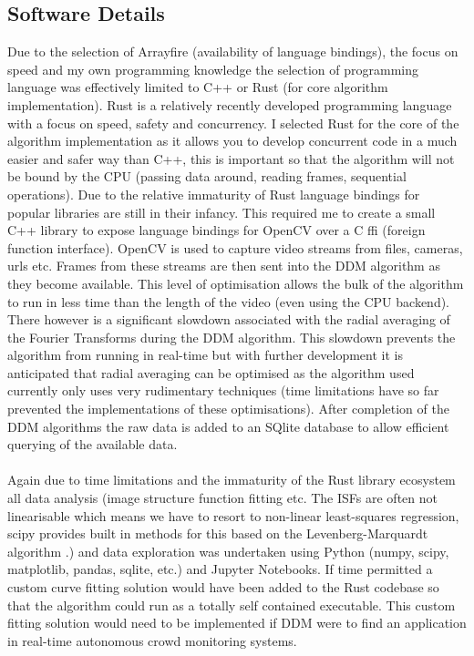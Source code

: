 \documentclass[11pt]{article}
\begin{document}
\subsection{Software Details}
Due to the selection of Arrayfire (availability of language bindings), the focus on speed and my own programming knowledge the selection of programming language was effectively limited to C++ or Rust \cite{rust} (for core algorithm implementation). Rust is a relatively recently developed programming language with a focus on speed, safety and concurrency. I selected Rust for the core of the algorithm implementation as it allows you to develop concurrent code in a much easier and safer way than C++, this is important so that the algorithm will not be bound by the CPU (passing data around, reading frames, sequential operations). Due to the relative immaturity of Rust language bindings for popular libraries are still in their infancy. This required me to create a small C++ library to expose language bindings for OpenCV over a C ffi (foreign function interface). OpenCV is used to capture video streams from files, cameras, urls etc. Frames from these streams are then sent into the DDM algorithm as they become available. This level of optimisation allows the bulk of the algorithm to run in less time than the length of the video (even using the CPU backend). There however is a significant slowdown associated with the radial averaging of the Fourier Transforms during the DDM algorithm. This slowdown prevents the algorithm from running in real-time but with further development it is anticipated that radial averaging can be optimised as the algorithm used currently only uses very rudimentary techniques (time limitations have so far prevented the implementations of these optimisations). After completion of the DDM algorithms the raw data is added to an SQlite database to allow efficient querying of the available data.
\\\\
Again due to time limitations and the immaturity of the Rust library ecosystem all data analysis (image structure function fitting etc. The ISFs are often not linearisable which means we have to resort to non-linear least-squares regression, scipy provides built in methods for this based on the Levenberg-Marquardt algorithm \cite{scipy_fit}.) and data exploration was undertaken using Python (numpy, scipy, matplotlib, pandas, sqlite, etc.) and Jupyter Notebooks. If time permitted a custom curve fitting solution would have been added to the Rust codebase so that the algorithm could run as a totally self contained executable. This custom fitting solution would need to be implemented if DDM were to find an application in real-time autonomous crowd monitoring systems.
\end{document}
